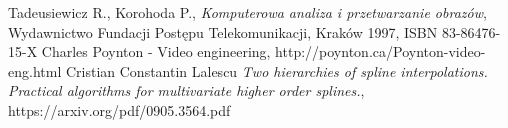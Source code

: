 \documentclass[twoside]{projektInzynierskiMS}
\begin{document}
\begin{thebibliography}{12}

 Tadeusiewicz R., Korohoda P., \emph{Komputerowa analiza i przetwarzanie obrazów}, Wydawnictwo Fundacji Postępu Telekomunikacji, Kraków 1997, ISBN 83-86476-15-X
 Charles Poynton - Video engineering, http://poynton.ca/Poynton-video-eng.html
 Cristian Constantin Lalescu \emph{Two hierarchies of spline interpolations.  Practical algorithms for multivariate higher order splines.}, https://arxiv.org/pdf/0905.3564.pdf

\end{thebibliography}
\end{document}
